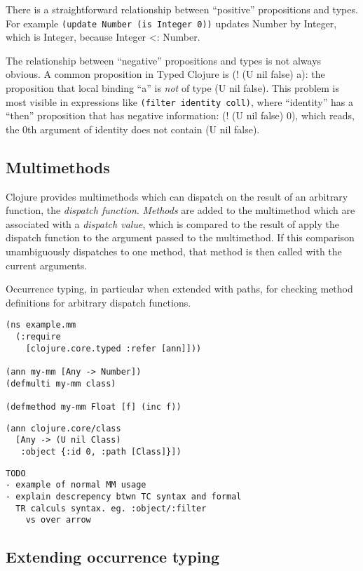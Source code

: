 \documentclass[preprint,10pt]{sigplanconf}
\begin{document}
There is a straightforward relationship between ``positive'' propositions and types.
For example 
{\tt (update Number (is Integer 0))}
updates Number by Integer, which is Integer, because Integer <: Number.

The relationship between ``negative'' propositions and types is not always obvious.
A common proposition in Typed Clojure is (! (U nil false) a): the proposition that
local binding ``a'' is \emph{not} of type (U nil false).
This problem is most visible in expressions like {\tt (filter identity coll)}, where
``identity'' has a ``then'' proposition that has negative information: (! (U nil false) 0),
which reads, the 0th argument of identity does not contain (U nil false).

\subsection{Multimethods}

Clojure provides multimethods which can dispatch on the result of an
arbitrary function, the \emph{dispatch function}. \emph{Methods} are
added to the multimethod
which are associated with a \emph{dispatch value}, which is compared to the
result of apply the dispatch function to the argument passed to the
multimethod. If this comparison unambiguously dispatches to one method,
that method is then called with the current arguments.

Occurrence typing, in particular when extended with paths,
for checking method definitions for arbitrary dispatch functions.

\begin{lstlisting}
(ns example.mm
  (:require 
    [clojure.core.typed :refer [ann]]))

(ann my-mm [Any -> Number])
(defmulti my-mm class)

(defmethod my-mm Float [f] (inc f))
\end{lstlisting}

\begin{lstlisting}
(ann clojure.core/class
  [Any -> (U nil Class)
   :object {:id 0, :path [Class]}])
\end{lstlisting}

\begin{verbatim}
TODO
- example of normal MM usage
- explain descrepency btwn TC syntax and formal
  TR calculs syntax. eg. :object/:filter 
    vs over arrow
\end{verbatim}

\subsection{Extending occurrence typing}
\end{document}
